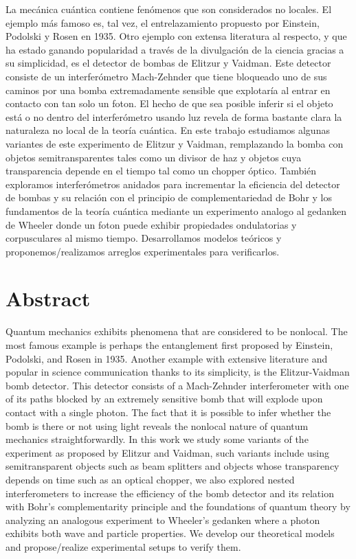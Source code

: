 \documentclass[12pt]{book}
\newcommand\blankpage{
    \null
    \thispagestyle{empty}
    \addtocounter{page}{0}
    \newpage
    }
\begin{document}
La mecánica cuántica contiene fenómenos que son considerados no locales. El ejemplo más famoso es, tal vez, el entrelazamiento propuesto por Einstein, Podolski y Rosen en 1935. Otro ejemplo con extensa literatura al respecto, y que ha estado ganando popularidad a través de la divulgación de la ciencia gracias a su simplicidad, es el detector de bombas de Elitzur y Vaidman. Este detector consiste de un interferómetro  Mach-Zehnder que tiene bloqueado uno de sus caminos por una bomba extremadamente sensible que explotaría al entrar en contacto con tan solo un foton. El hecho de que sea posible inferir si el objeto está o no dentro del interferómetro usando luz revela de forma bastante clara la naturaleza no local de la teoría cuántica. En este trabajo estudiamos algunas variantes de este experimento de Elitzur y Vaidman, remplazando la bomba con objetos semitransparentes tales como un divisor de haz y objetos cuya transparencia depende en el tiempo tal como un chopper óptico. También exploramos interferómetros anidados para incrementar la eficiencia del detector de bombas y su relación con el principio de complementariedad de Bohr y los fundamentos de la teoría cuántica mediante un experimento analogo al gedanken de Wheeler donde un foton puede exhibir propiedades ondulatorias y corpusculares al mismo tiempo. Desarrollamos modelos teóricos y proponemos/realizamos arreglos experimentales para verificarlos.
\thispagestyle{plain}

\pagebreak



\blankpage{}
\chapter*{Abstract}
\thispagestyle{plain}
Quantum mechanics exhibits phenomena that are considered to be nonlocal. The most famous example is perhaps the entanglement first proposed by Einstein, Podolski, and Rosen in 1935. Another example with extensive literature and  popular in science communication thanks to its simplicity, is the Elitzur-Vaidman bomb detector. This detector consists of a Mach-Zehnder interferometer with one of its paths blocked by an extremely sensitive bomb that will explode upon contact with a single photon. The fact that it is possible to infer whether the bomb is there or not using light reveals the nonlocal nature of quantum mechanics straightforwardly. In this work we study some variants of the experiment as proposed by Elitzur and Vaidman, such variants include using semitransparent objects such as beam splitters and objects whose transparency depends on time such as an optical chopper, we also explored nested interferometers to increase the efficiency of the bomb detector and its relation with Bohr's complementarity principle and the foundations of quantum theory by analyzing an analogous experiment to Wheeler's gedanken where a photon exhibits both wave and particle properties. We develop our theoretical models and propose/realize experimental setups to verify them. 
\end{document}
